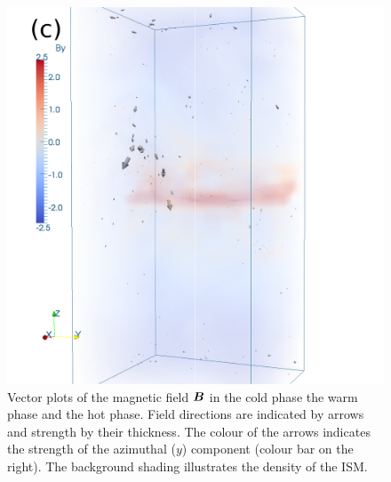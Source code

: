 \documentclass[useAMS,usenatbib]{mn2e}
\begin{document}
\begin{figure}
  \includegraphics[angle=0, trim=0.5cm 0cm 2cm 0cm, clip=true, totalheight=0.33\textheight]{fig/b310h.png}
  \hspace{-4.5cm}
  \caption[Volume snapshots of $\vect{B}$ by phase for Model~$\Ompa$]{
  Vector plots of the magnetic field $\vect{B}$ {} in the cold phase
  {} the warm phase and {} the hot phase.
  Field directions are indicated by arrows and strength by their thickness.
  The colour of the arrows indicates the strength of the
  azimuthal ($y$) component (colour bar on the right).
  The background shading illustrates the density of the ISM.
  \label{fig:b3box}}
  \end{figure}
\end{document}
